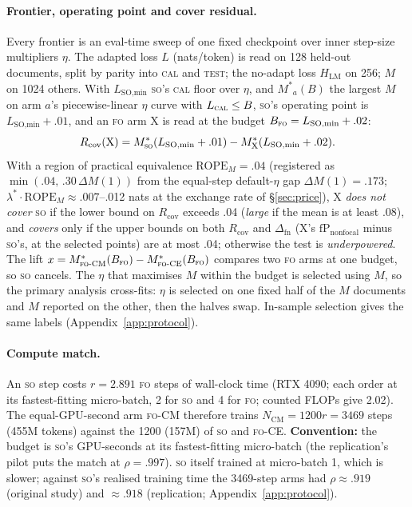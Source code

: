 \documentclass[11pt]{article}
\newcommand{\FO}{\textsc{fo}}
\newcommand{\SO}{\textsc{so}}
\newcommand{\Mstar}{\ensuremath{M^{\ast}}}
\newcommand{\lam}{\ensuremath{\lambda^{\ast}}}
\newcommand{\Rcov}{\ensuremath{R_{\mathrm{cov}}}}
\begin{document}
\paragraph{Frontier, operating point and cover residual.}
Every frontier is an eval-time sweep of one fixed checkpoint over inner step-size multipliers $\eta$.
The adapted loss $L$ (nats/token) is read on 128 held-out documents, split by parity into
\textsc{cal} and \textsc{test}; the no-adapt loss $H_{\text{LM}}$ on 256; $M$ on 1024 others. With
$L_{\text{SO,min}}$ \SO's \textsc{cal} floor over $\eta$, and $\Mstar_a(B)$ the largest $M$ on arm
$a$'s piecewise-linear $\eta$ curve with $L_{\textsc{cal}}\le B$, \SO's operating point is
$L_{\text{SO,min}}+.01$, and an \FO{} arm X is read at the budget $B_{\FO}=L_{\text{SO,min}}+.02$:
\begin{equation}
  \Rcov(\text{X}) = \Mstar_{\SO}(L_{\text{SO,min}}+.01) - \Mstar_{\text{X}}(L_{\text{SO,min}}+.02).
  \label{eq:Rcov}
\end{equation}
With a region of practical equivalence $\text{ROPE}_M=.04$ (registered as $\min(.04,\,.30\,\Delta M(1))$
from the equal-step default-$\eta$ gap $\Delta M(1)=.173$; $\lam\cdot\text{ROPE}_M\approx.007$--.012
nats at the exchange rate of \S\ref{sec:price}), X \emph{does not cover} \SO{} if the lower bound on $\Rcov$ exceeds .04
(\emph{large} if the mean is at least .08), and \emph{covers} only if the upper bounds on both $\Rcov$
and $\Delta_{\text{fn}}$ (X's $\mathrm{fP}_{\text{nonfocal}}$ minus \SO's, at the selected points) are
at most .04; otherwise the test is \emph{underpowered}. The lift
$x=\Mstar_{\FO\text{-CM}}(B_{\FO})-\Mstar_{\FO\text{-CE}}(B_{\FO})$ compares two \FO{} arms at one
budget, so \SO{} cancels. The $\eta$ that maximises $M$ within the budget is selected using $M$, so
the primary analysis cross-fits: $\eta$ is selected on one fixed half of the $M$ documents and $M$
reported on the other, then the halves swap. In-sample selection gives the same labels
(Appendix~\ref{app:protocol}).

\paragraph{Compute match.}
An \SO{} step costs $r=2.891$ \FO{} steps of wall-clock time (RTX 4090; each order at its
fastest-fitting micro-batch, 2 for \SO{} and 4 for \FO; counted FLOPs give 2.02). The
equal-GPU-second arm \FO-CM{} therefore trains $N_{\text{CM}}=1200r=3469$ steps (455M tokens) against
the 1200 (157M) of \SO{} and \FO-CE.
\textbf{Convention:} the budget is \SO's GPU-seconds at its fastest-fitting micro-batch (the
replication's pilot puts the match at $\rho=.997$). \SO{} itself trained at micro-batch 1, which is
slower; against \SO's realised training time the 3469-step arms had $\rho\approx.919$ (original
study) and $\approx.918$ (replication; Appendix~\ref{app:protocol}).
\end{document}
